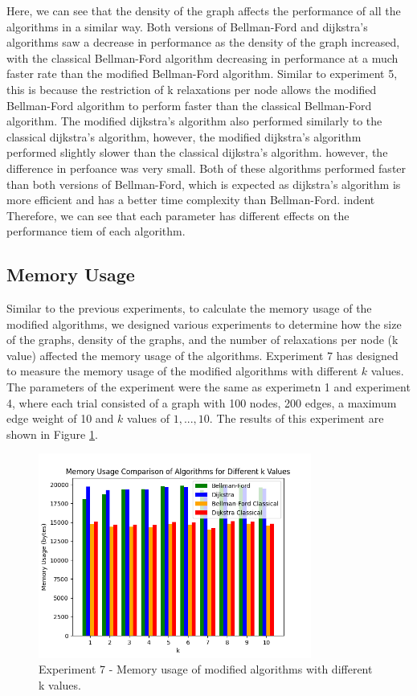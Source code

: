 \documentclass[12pt]{article}
\begin{document}
\newpage

Here, we can see that the density of the graph affects the performance of all the algorithms in a similar way.
Both versions of Bellman-Ford and dijkstra's algorithms saw a decrease in performance as the density of the graph increased, with the classical Bellman-Ford algorithm decreasing in performance at a much faster rate than the modified Bellman-Ford algorithm.
Similar to experiment 5, this is because the restriction of k relaxations per node allows the modified Bellman-Ford algorithm to perform faster than the classical Bellman-Ford algorithm.
The modified dijkstra's algorithm also performed similarly to the classical dijkstra's algorithm,
however, the modified dijkstra's algorithm performed slightly slower than the classical dijkstra's algorithm. however, the difference in perfoance was very small. 
Both of these algorithms performed faster than both versions of Bellman-Ford, which is expected as dijkstra's algorithm is more efficient and has a better time complexity than Bellman-Ford.
\smallskip
\newline
indent
Therefore, we can see that each parameter has different effects on the performance tiem of each algorithm.

\subsection*{Memory Usage}
Similar to the previous experiments, to calculate the memory usage of the modified algorithms, we designed various experiments to determine how the size of the graphs, density of the graphs, and the number of relaxations per node (k value) affected the memory usage of the algorithms.
\smallskip
\newline
\indent
Experiment 7 has designed to measure the memory usage of the modified algorithms with different $k$ values. The 
parameters of the experiment were the same as experimetn 1 and experiment 4, where each trial consisted of a graph with 100 nodes, 200 edges, a maximum edge weight of 10 and $k$ values of $1, ... , 10$.
The results of this experiment are shown in Figure \ref{fig:Figure 7}.

\begin{figure}[H] 
    \centering
    \includegraphics[width=0.8\textwidth]{Figures/Memory_kvals.png} 
    \caption{\footnotesize Experiment 7 - Memory usage of modified algorithms with different k values.}
    \label{fig:Figure 7} 
\end{figure}
\end{document}
